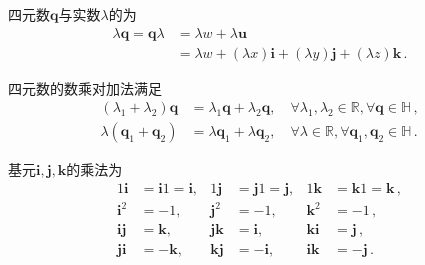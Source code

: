 \begin{definition}
    四元数${\bm q}$与实数$\lambda$的为
    \begin{align}
        \lambda{\bm q}={\bm q}\lambda & =\lambda w+\lambda {\bm u}\nonumber                                              \\
                                      & =\lambda w+(\lambda x)\mathbf{i}+(\lambda y)\mathbf{j}+(\lambda z)\mathbf{k}\, .
    \end{align}
\end{definition}
\begin{proposition}
    四元数的数乘对加法满足
    \begin{align}
        (\lambda_1+\lambda_2){\bm q} & =\lambda_1{\bm q}+\lambda_2{\bm q}, \quad \forall \lambda_1, \lambda_2\in\mathbb{R}, \forall {\bm q}\in\mathbb{H}\, , \\
        \lambda({\bm q}_1+{\bm q}_2) & =\lambda{\bm q}_1+\lambda{\bm q}_2, \quad \forall \lambda\in\mathbb{R}, \forall {\bm q}_1, {\bm q}_2\in\mathbb{H}\, .
    \end{align}
\end{proposition}
\begin{definition}
    基元$\mathbf{i}, \mathbf{j}, \mathbf{k}$的乘法为
    \begin{align}
        1\mathbf{i}  & =\mathbf{i}1=\mathbf{i}, & 1\mathbf{j}  & =\mathbf{j}1=\mathbf{j}, & 1\mathbf{k}  & =\mathbf{k}1=\mathbf{k}\, ,\nonumber \\
        \mathbf{i}^2 & =-1,                     & \mathbf{j}^2 & =-1,                     & \mathbf{k}^2 & =-1\, ,                    \nonumber \\
        \mathbf{ij}  & =\mathbf{k},             & \mathbf{jk}  & =\mathbf{i},             & \mathbf{ki}  & =\mathbf{j}\, ,            \nonumber \\
        \mathbf{ji}  & =-\mathbf{k},            & \mathbf{kj}  & =-\mathbf{i},            & \mathbf{ik}  & =-\mathbf{j}\, .
    \end{align}
\end{definition}
